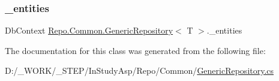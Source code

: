 \mbox{\label{class_repo_1_1_common_1_1_generic_repository_a24c97c27d80ffec6a2c058a183b5941e}} 
\subsubsection{\texorpdfstring{\+\_\+entities}{\_entities}}
{\footnotesize\ttfamily Db\+Context \hyperlink{class_repo_1_1_common_1_1_generic_repository}{Repo.\+Common.\+Generic\+Repository}$<$ T $>$.\+\_\+entities\hspace{0.3cm}{\ttfamily [protected]}}



The documentation for this class was generated from the following file\+:\begin{DoxyCompactItemize}
\item 
D\+:/\+\_\+\+W\+O\+R\+K/\+\_\+\+S\+T\+E\+P/\+In\+Study\+Asp/\+Repo/\+Common/\hyperlink{_generic_repository_8cs}{Generic\+Repository.\+cs}\end{DoxyCompactItemize}
